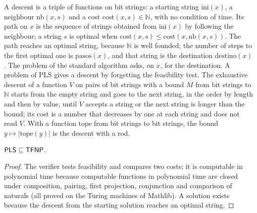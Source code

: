 \begin{definition}
  \label{def:search-descent}
  \leanok
  A descent is a triple of functions on bit strings: a starting string $\mathrm{ini}(x)$, a
  neighbour $\mathrm{nb}(x, s)$ and a cost $\mathrm{cost}(x, s) \in \mathbb{N}$, with no condition
  of time. Its path on $x$ is the sequence of strings obtained from $\mathrm{ini}(x)$ by following
  the neighbour; a string $s$ is optimal when $\mathrm{cost}(x, s) \le \mathrm{cost}(x, \mathrm{nb}(x, s))$.
  The path reaches an optimal string, because $\mathbb{N}$ is well founded; the number of steps
  to the first optimal one is $\mathrm{pasos}(x)$, and that string is the destination
  $\mathrm{destino}(x)$. The problem of the standard algorithm asks, on $x$, for the destination.
  A problem of PLS gives a descent by forgetting the feasibility test. The exhaustive descent of a
  function $V$ on pairs of bit strings with a bound $M$ from bit strings to $\mathbb{N}$ starts from
  the empty string and goes to the next string, in the order by length and then by value, until
  $V$ accepts a string or the next string is longer than the bound; its cost is a number that
  decreases by one at each string and does not read $V$. With a function $\mathrm{tope}$ from bit
  strings to bit strings, the bound $y \mapsto |\mathrm{tope}(y)|$ is the descent with a rod.
\end{definition}

\begin{theorem}
  \label{thm:search-pls-tfnp}
  \leanok
  $\mathsf{PLS} \subseteq \mathsf{TFNP}$.
\end{theorem}

\begin{proof}
  \leanok
  The verifier tests feasibility and compares two costs; it is computable in polynomial time
  because computable functions in polynomial time are closed under composition, pairing, first
  projection, conjunction and comparison of naturals (all proved on the Turing machines of
  Mathlib). A solution exists because the descent from the starting solution reaches an optimal
  string.
\end{proof}


